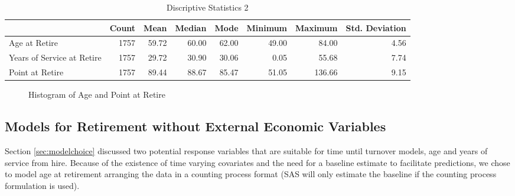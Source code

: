 \documentclass[12pt,letterpaper]{article}
\begin{document}
\begin{table}[htbp]
	\centering
	\scriptsize
	\caption{Discriptive Statistics 2}
	\begin{tabular}{lrrrrrrr}
		\toprule
		& Count & Mean  & Median & Mode  & Minimum & Maximum & Std. Deviation \\
		\midrule
		\multicolumn{1}{l}{Age at Retire} & 1757  & 59.72 & 60.00 & 62.00 & 49.00 & 84.00 & 4.56 \\
		\multicolumn{1}{l}{Years of Service at Retire} & 1757  & 29.72 & 30.90 & 30.06 & 0.05  & 55.68 & 7.74 \\
		\multicolumn{1}{l}{Point at Retire} & 1757  & 89.44 & 88.67 & 85.47 & 51.05 & 136.66 & 9.15 \\
		\bottomrule
	\end{tabular}%
	\label{tab:descrip2}%
\end{table}%

\begin{figure}[h!]
	\centering
	\caption{Histogram of Age and Point at Retire}
	\label{fig:hist}
\end{figure}



\subsection{Models for Retirement without External Economic Variables}
Section \ref{sec:modelchoice} discussed two potential response variables that are suitable for time until turnover models, age and years of service from hire.  Because of the existence of time varying covariates and the need for a baseline estimate to facilitate predictions, we chose to model age at retirement arranging the data in a counting process format (SAS will only estimate the baseline if the counting process formulation is used).
\end{document}
